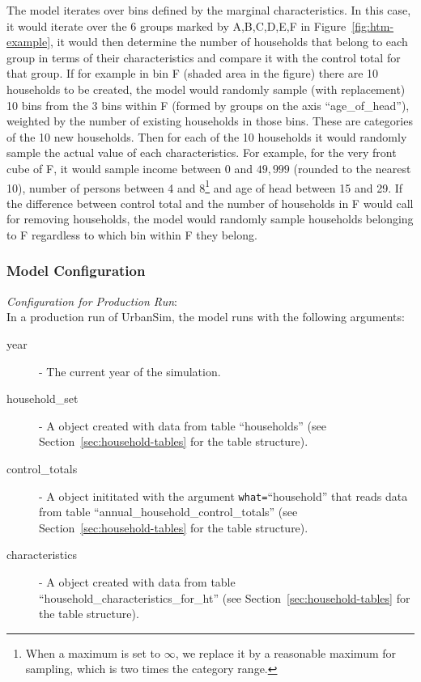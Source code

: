 The model iterates over bins defined by the marginal characteristics. In this
case, it would iterate over the 6 groups marked by A,B,C,D,E,F in
Figure~\ref{fig:htm-example}, it would then determine the number of households
that belong to each group in terms of their characteristics and compare it
with the control total for that group. If for example in bin F (shaded area in
the figure) there are 10 households to be created, the model would randomly
sample (with replacement) 10 bins from the 3 bins within F (formed by groups
on the axis ``age_of_head''), weighted by the number of existing households in
those bins.  These are categories of the 10 new households. Then for each of
the 10 households it would randomly sample the actual value of each
characteristics.  For example, for the very front cube of F, it would sample
income between 0 and $49,999$ (rounded to the nearest 10), number of persons
between 4 and 8\footnote{When a maximum is set to $\infty$, we replace it by a
  reasonable maximum for sampling, which is two times the category range.}
and age of head between 15 and 29.  If the difference between control total
and the number of households in F would call for removing households, the
model would randomly sample households belonging to F regardless to which bin
within F they belong.

\subsubsection{Model Configuration}
\modelsindex
%
{\em Configuration for Production Run}:\\[1mm]
In a production run of UrbanSim, the model runs with the following arguments:
\begin{description}
\item[year] - The current year of the simulation.
\item[household_set] - A  object created with data from
  table ``households'' (see Section~\ref{sec:household-tables}
  for the table structure).
\item[control_totals] - A  object inititated with the
  argument \verb|what=|``household'' that reads data from table
  ``annual_household_control_totals'' (see Section~\ref{sec:household-tables}
  for the table structure).
\item[characteristics] - A  object created
  with data from table ``household_characteristics_for_ht'' (see
  Section~\ref{sec:household-tables} for the table structure).
\end{description}


